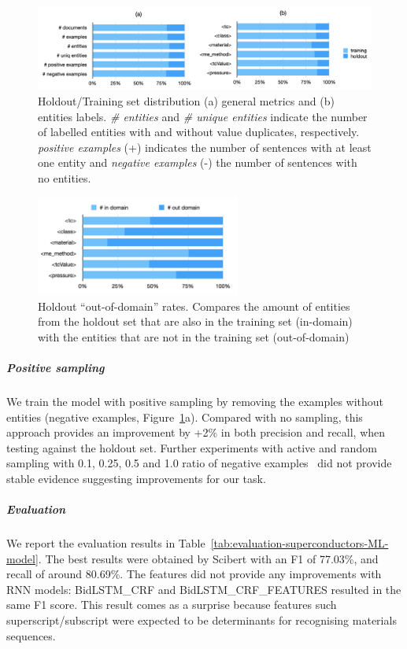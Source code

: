 \documentclass[]{interact}
\theoremstyle{plain}%
\theoremstyle{definition}
\theoremstyle{remark}
\begin{document}
\begin{figure}[ht]
\centering
\includegraphics[width=\textwidth]{holdout-training-set}
\caption{Holdout/Training set distribution (a) general metrics and (b) entities labels.
\textit{\# entities} and \textit{\# unique entities} indicate the number of labelled entities with and without value duplicates, respectively. \textit{positive examples} (+) indicates the number of sentences with at least one entity and \textit{negative examples} (-) the number of sentences with no entities.}
\label{fig:training-holdout-set-distribution}
\end{figure}

\begin{figure}[ht]
\centering
\includegraphics[width=0.6\textwidth]{out-domain-holdout-unique}
\caption{Holdout ``out-of-domain'' rates. Compares the amount of entities from the holdout set that are also in the training set (in-domain) with the entities that are not in the training set (out-of-domain)}
\label{fig:out-domain-holdout}
\end{figure}

\subparagraph*{Positive sampling} 
We train the model with positive sampling by removing the examples without entities (negative examples, Figure~\ref{fig:training-holdout-set-distribution}a). 
Compared with no sampling, this approach provides an improvement by +2\% in both precision and recall, when testing against the holdout set. 
Further experiments with active and random sampling with 0.1, 0.25, 0.5 and 1.0 ratio of negative examples~\cite{lopez2021mining} did not provide stable evidence suggesting improvements for our task. 

\subparagraph*{Evaluation}

We report the evaluation results in Table~\ref{tab:evaluation-superconductors-ML-model}. 
The best results were obtained by Scibert with an F1 of 77.03\%, and recall of around 80.69\%. 
The features did not provide any improvements with RNN models: BidLSTM\_CRF and BidLSTM\_CRF\_FEATURES resulted in the same F1 score.
This result comes as a surprise because features such superscript/subscript were expected to be determinants for recognising materials sequences. 
\end{document}

